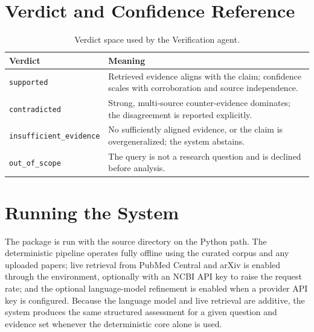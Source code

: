 \section{Verdict and Confidence Reference}

\begin{table}[!htbp]
\centering
\label{tab:verdict-map}
\begin{tabular}{p{}p{}}
\toprule
Verdict & Meaning \\
\midrule
\texttt{supported} & Retrieved evidence aligns with the claim; confidence scales with corroboration and source independence. \\
\texttt{contradicted} & Strong, multi-source counter-evidence dominates; the disagreement is reported explicitly. \\
\texttt{insufficient\_evidence} & No sufficiently aligned evidence, or the claim is overgeneralized; the system abstains. \\
\texttt{out\_of\_scope} & The query is not a research question and is declined before analysis. \\
\bottomrule
\end{tabular}
\caption{Verdict space used by the Verification agent.}
\end{table}

\section{Running the System}

The package is run with the source directory on the Python path. The deterministic pipeline operates fully offline
using the curated corpus and any uploaded papers; live retrieval from PubMed Central and arXiv is enabled through
the environment, optionally with an NCBI API key to raise the request rate; and the optional language-model
refinement is enabled when a provider API key is configured. Because the language model and live retrieval are
additive, the system produces the same structured assessment for a given question and evidence set whenever the
deterministic core alone is used.
